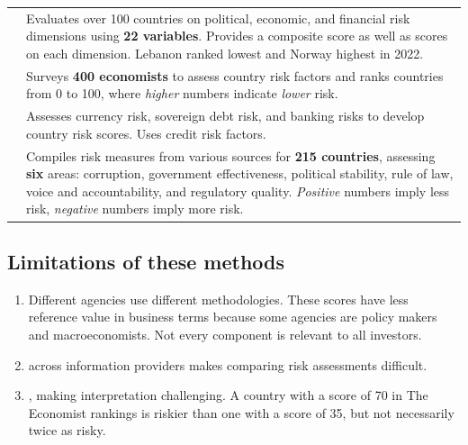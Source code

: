 \begin{center}
\footnotesize
\begin{tabular}{L{3.2cm} L{11.3cm}}
\toprule
{} &  \\
\midrule
{} & Evaluates over 100 countries on
political, economic, and financial risk dimensions using \textbf{22 variables}.
Provides a composite score as well as scores on each dimension. Lebanon ranked
lowest and Norway highest in 2022. \\
 & Surveys \textbf{400 economists} to assess country risk factors
and ranks countries from 0 to 100, where \emph{higher} numbers indicate
\emph{lower} risk. \\
 & Assesses currency risk, sovereign debt risk, and banking
risks to develop country risk scores. Uses credit risk factors. \\
 & Compiles risk measures from various sources for
\textbf{215 countries}, assessing \textbf{six} areas: corruption, government
effectiveness, political stability, rule of law, voice and accountability, and
regulatory quality. \emph{Positive} numbers imply less risk, \emph{negative}
numbers imply more risk. \\
\bottomrule
\end{tabular}
\end{center}

\subsection*{Limitations of these methods}

\begin{enumerate}
\item {} Different agencies use different
methodologies. These scores have less reference value in business terms because
some agencies are policy makers and macroeconomists. Not every component is
relevant to all investors.
\item {} across information providers makes comparing
risk assessments difficult.
\item {}, making
interpretation challenging. A country with a score of 70 in The Economist
rankings is riskier than one with a score of 35, but not necessarily twice as
risky.
\end{enumerate}

